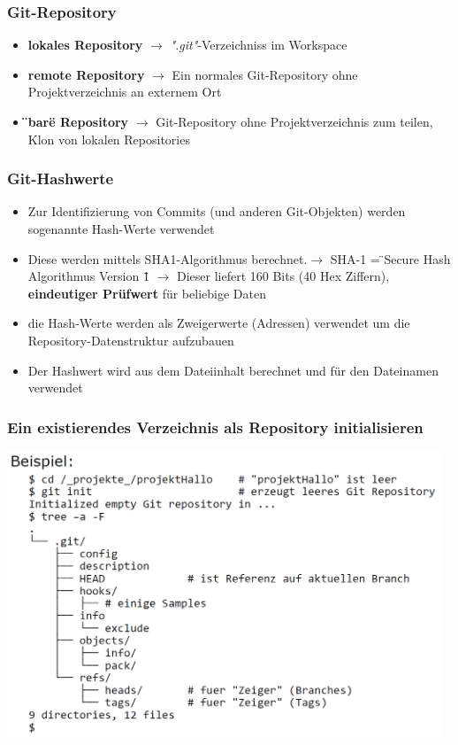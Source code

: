 \subsubsection{Git-Repository}
\begin{itemize}
	\item \textbf{lokales Repository} $\rightarrow$ \textit{".git"}-Verzeichniss im Workspace
	\item \textbf{remote Repository} $\rightarrow$ Ein normales Git-Repository ohne Projektverzeichnis an externem Ort
	\item \textbf{\"{}bare\"{} Repository} $\rightarrow$ Git-Repository ohne Projektverzeichnis zum teilen, Klon von lokalen Repositories
\end{itemize}
\subsubsection{Git-Hashwerte}
\begin{itemize}
	\item Zur Identifizierung von Commits (und anderen Git-Objekten) werden sogenannte Hash-Werte verwendet
	\item Diese werden mittels SHA1-Algorithmus berechnet.\newline $\rightarrow$ SHA-1 = \"{}Secure Hash Algorithmus Version 1\"{}\newline
	$\rightarrow$ Dieser liefert 160 Bits (40 Hex Ziffern), \textbf{eindeutiger Prüfwert} für beliebige Daten
	\item die Hash-Werte werden als Zweigerwerte (Adressen) verwendet um die Repository-Datenstruktur aufzubauen
	\item Der Hashwert wird aus dem Dateiinhalt berechnet und für den Dateinamen verwendet
\end{itemize}
\subsubsection{Ein existierendes Verzeichnis als Repository initialisieren}
\includegraphics[width = 13cm]{images/bsprepo}
